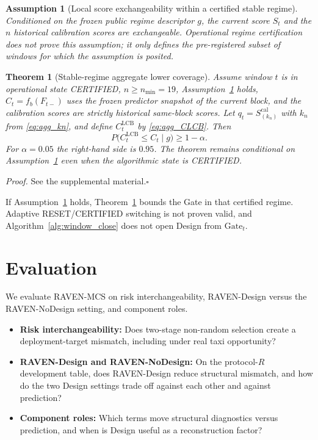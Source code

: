\documentclass[letterpaper,journal]{IEEEtran}
\newtheorem{theorem}{Theorem}
\newtheorem{assumption}{Assumption}
\begin{document}
\begin{assumption}[Local score exchangeability within a certified stable regime]
\label{ass:score-exchangeability}
Conditioned on the frozen public regime descriptor $g$, the current score
$S_t$ and the $n$ historical calibration scores are exchangeable.  Operational
regime certification does not prove this assumption; it only defines the
pre-registered subset of windows for which the assumption is posited.
\end{assumption}

\begin{theorem}[Stable-regime aggregate lower coverage]
\label{thm:agg-lcb}
Assume window $t$ is in operational state CERTIFIED, $n\ge n_{\min}=19$,
Assumption~\ref{ass:score-exchangeability} holds, $\widehat C_t=f_b(F_{t-})$
uses the frozen predictor snapshot of the current block, and the calibration
scores are strictly historical same-block scores.  Let
$q_t=S_{(k_n)}^{\mathrm{cal}}$ with $k_n$ from \eqref{eq:agg_kn}, and define
$C^{\mathrm{LCB}}_t$ by \eqref{eq:agg_CLCB}.  Then
\begin{equation}
 P\bigl(C^{\mathrm{LCB}}_t\le C_t\mid g\bigr)\ge 1-\alpha.
 \label{eq:agg_thm1}
\end{equation}
For $\alpha=0.05$ the right-hand side is $0.95$.  The theorem remains
conditional on Assumption~\ref{ass:score-exchangeability} even when the
algorithmic state is CERTIFIED.
\end{theorem}

\noindent\emph{Proof.}
See the supplemental material.\hfill$\square$

If Assumption~\ref{ass:score-exchangeability} holds, Theorem~\ref{thm:agg-lcb}
bounds the Gate in that certified regime.  Adaptive RESET/CERTIFIED switching
is not proven valid, and Algorithm~\ref{alg:window_close} does not open Design
from $\mathrm{Gate}_t$.

\section{Evaluation}
\label{sec:evaluation}

We evaluate RAVEN-MCS on risk interchangeability, RAVEN-Design versus
the RAVEN-NoDesign setting, and component roles.

\begin{itemize}
    \item \textbf{Risk interchangeability:} Does two-stage non-random
    selection create a deployment-target mismatch, including under real
    taxi opportunity?
    \item \textbf{RAVEN-Design and RAVEN-NoDesign:} On the protocol-$R$
    development table, does RAVEN-Design reduce structural mismatch, and
    how do the two Design settings trade off against each other and against
    prediction?
    \item \textbf{Component roles:} Which terms move structural
    diagnostics versus prediction, and when is Design useful as a
    reconstruction factor?
\end{itemize}
\end{document}
